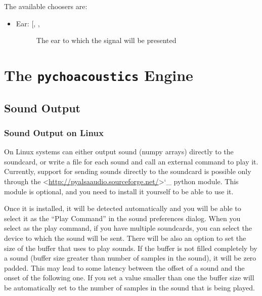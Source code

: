 \documentclass[a4paper,12pt,english]{sphinxmanual}
\begin{document}
The available choosers are:
\begin{itemize}
\item {} \begin{description}
\item[{Ear: {[}, , \code{Both}{]}}] \leavevmode
The ear to which the signal will be presented

\end{description}

\end{itemize}


\chapter{The \texttt{pychoacoustics} Engine}
\label{engine:sec-engine}\label{engine:the-pychoacoustics-engine}\label{engine::doc}

\section{Sound Output}
\label{engine:sound-output}\label{engine:sec-sound-output}

\subsection{Sound Output on Linux}
\label{engine:sound-output-on-linux}
On Linux systems  can either output sound (numpy
arrays) directly to the soundcard, or write a  file for each sound
and call an external command to play it. Currently, support for sending
sounds directly to the soundcard is possible only through the
 \textless{}\href{http://pyalsaaudio.sourceforge.net/}{http://pyalsaaudio.sourceforge.net/}\textgreater{}{}`\_ python module. This
module is optional, and you need to install it yourself to be able to
use it.

Once it is installed, it will be detected automatically and you will be
able to select it as the “Play Command” in the sound preferences dialog.
When you select  as the play command, if you have multiple
soundcards, you can select the device to which the sound will be sent.
There will be also an option to set the size of the buffer that
 uses to play sounds. If the buffer is not filled completely by
a sound (buffer size greater than number of samples in the sound), it
will be zero padded. This may lead to some latency between the offset of
a sound and the onset of the following one. If you set a value smaller
than one the buffer size will be automatically set to the number of
samples in the sound that is being played.
\end{document}
